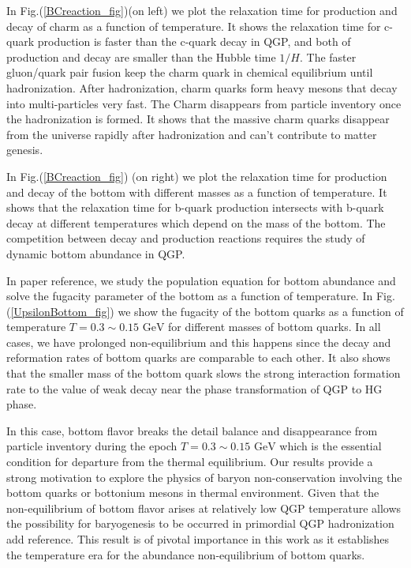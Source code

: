 \documentclass[universe,article,submit,moreauthors,pdftex,a4paper]{Definitions/mdpi}
\newcommand{\GeV}{\text{ GeV}}
\newcommand*{\xblue}{\color{blue}}
\begin{document}
In Fig.(\ref{BCreaction_fig})(on left) we plot the relaxation time for production and decay of charm as a function of temperature. It shows the relaxation time for c-quark production is faster than the c-quark decay in QGP, and both of production and decay are smaller than the Hubble time $1/H$. The faster gluon/quark pair fusion keep the charm quark in chemical equilibrium until hadronization. After hadronization, charm quarks form heavy mesons that decay into multi-particles very fast. The Charm disappears from particle inventory once the hadronization is formed. It shows that the massive charm quarks disappear from the universe rapidly after hadronization and can’t contribute to matter genesis.

In Fig.(\ref{BCreaction_fig}) (on right) we plot the relaxation time for production and decay of the bottom with different masses as a function of temperature. It shows that the relaxation time for b-quark production intersects with b-quark decay at different temperatures which depend on the mass of the bottom. The competition between decay and production reactions requires the study of dynamic bottom abundance in QGP.

In paper {\xblue reference}, we study the population equation for bottom abundance and solve the fugacity parameter of the bottom as a function of temperature. In Fig.(\ref{UpsilonBottom_fig}) we show the fugacity of the bottom quarks as a function of temperature $T=0.3\sim0.15\GeV$ for different masses of bottom quarks. In all cases, we have prolonged non-equilibrium and this happens since the decay and reformation rates of bottom quarks are comparable to each other. It also shows that  the smaller mass of the bottom quark slows the strong interaction formation rate to the value of weak decay near the phase transformation of QGP to HG phase.

In this case, bottom flavor breaks the detail balance and disappearance from particle inventory during the epoch $T = 0.3 \sim0.15\GeV$ which is the essential condition for departure from the thermal equilibrium. Our results provide a strong motivation to explore the physics of baryon non-conservation involving the bottom quarks or bottonium mesons  in thermal environment. Given that the non-equilibrium of bottom flavor arises at relatively low QGP temperature allows the possibility for baryogenesis to be occurred in primordial QGP hadronization {\xblue add reference}.
This result is of pivotal importance in this work as it establishes the temperature era for the abundance non-equilibrium of bottom quarks.
\end{document}
